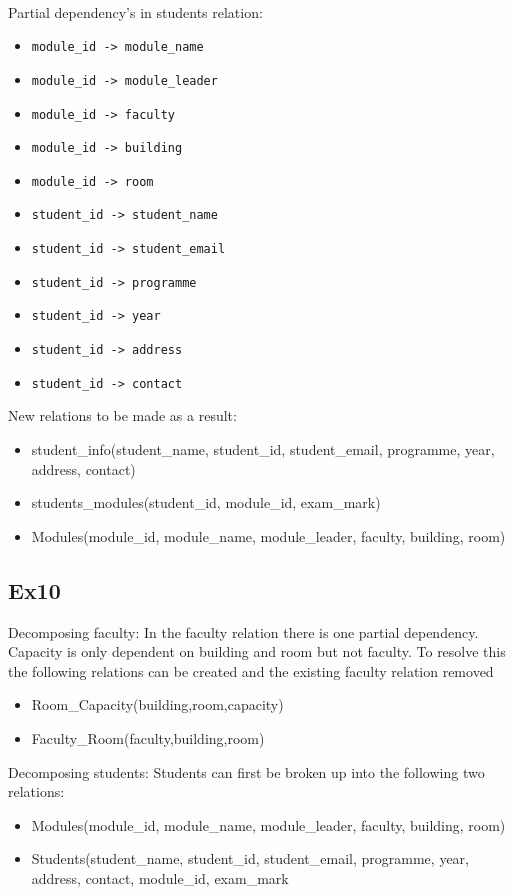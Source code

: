 \documentclass{article}
\begin{document}
\noindent
\\
Partial dependency's in students relation:

\begin{itemize}
    \item \verb|module_id -> module_name|
    \item \verb|module_id -> module_leader|
    \item \verb|module_id -> faculty|
    \item \verb|module_id -> building|
    \item \verb|module_id -> room|
    \item \verb|student_id -> student_name|
    \item \verb|student_id -> student_email|
    \item \verb|student_id -> programme|
    \item \verb|student_id -> year|
    \item \verb|student_id -> address|
    \item \verb|student_id -> contact|
\end{itemize}

\noindent
New relations to be made as a result:
\begin{itemize}
    \item student\_info(student\_name, student\_id, student\_email, programme, year, address, contact)
    \item students\_modules(student\_id, module\_id, exam\_mark)
    \item Modules(module\_id, module\_name, module\_leader, faculty, building, room)
\end{itemize}


\subsection{Ex10}

Decomposing faculty:
In the faculty relation there is one partial dependency. Capacity is only dependent on building and room but not faculty. To resolve this the following relations can be created and the existing faculty relation removed
\begin{itemize}
    \item Room\_Capacity(building,room,capacity)
    \item Faculty\_Room(faculty,building,room)
\end{itemize}

\noindent
Decomposing students:
Students can first be broken up into the following two relations:
\begin{itemize}
    \item Modules(module\_id, module\_name, module\_leader, faculty, building, room)
    \item Students(student\_name, student\_id, student\_email, programme, year, address, contact, module\_id, exam\_mark
\end{itemize}
\end{document}
